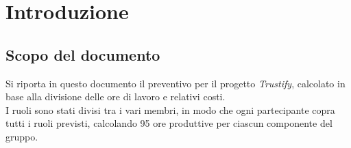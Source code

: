 \section{Introduzione}
\subsection{Scopo del documento}
Si riporta in questo documento il preventivo per il progetto \textit{Trustify}, calcolato in base alla divisione delle ore di lavoro e relativi costi. \\
I ruoli sono stati divisi tra i vari membri, in modo che ogni partecipante copra tutti i ruoli previsti, calcolando 95 ore produttive per ciascun componente del gruppo.
